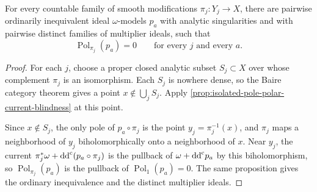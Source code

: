\begin{corollary}\label{cor:countable-modification-polar-blindness}
For every countable family of smooth modifications $\pi_j\colon Y_j\to X$, there are pairwise ordinarily inequivalent ideal $\omega$-models $p_a$ with analytic singularities and with pairwise distinct families of multiplier ideals, such that
\[
 \operatorname{Pol}_{\pi_j}(p_a)=0
       \qquad\text{for every }j\text{ and every }a.
\]
\end{corollary}
\begin{proof}
For each $j$, choose a proper closed analytic subset $S_j\subset X$ over whose complement $\pi_j$ is an isomorphism. Each $S_j$ is nowhere dense, so the Baire category theorem gives a point $x\notin\bigcup_jS_j$. Apply \cref{prop:isolated-pole-polar-current-blindness} at this point.

Since $x\notin S_j$, the only pole of $p_a\circ\pi_j$ is the point $y_j=\pi_j^{-1}(x)$, and $\pi_j$ maps a neighborhood of $y_j$ biholomorphically onto a neighborhood of $x$. Near $y_j$, the current $\pi_j^*\omega+\mathrm{dd}^{\mathrm{c}}(p_a\circ\pi_j)$ is the pullback of $\omega+\mathrm{dd}^{\mathrm{c}} p_a$ by this biholomorphism, so $\operatorname{Pol}_{\pi_j}(p_a)$ is the pullback of $\operatorname{Pol}_1(p_a)=0$. The same proposition gives the ordinary inequivalence and the distinct multiplier ideals.
\end{proof}
